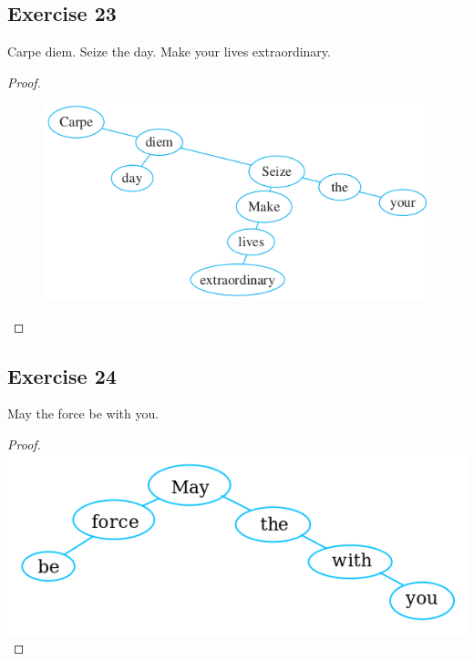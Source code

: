 \documentclass[14pt]{extarticle}
\begin{document}
\subsection{Exercise 23}
Carpe diem. Seize the day. Make your lives extraordinary.
\begin{proof}
    \begin{figure}[ht!]
        \centering
        \includegraphics[scale=0.6]{../images/10.5.23.png}
    \end{figure}
\end{proof}

\subsection{Exercise 24}
May the force be with you.
\begin{proof}
    \includegraphics[scale=0.5]{../images/10.5.24.png}
\end{proof}
\end{document}
